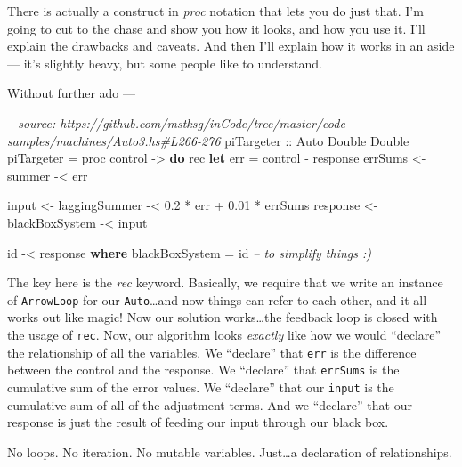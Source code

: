 \documentclass[]{article}
\newenvironment{Shaded}{}{}
\newcommand{\KeywordTok}[1]{\textcolor[rgb]{0.00,0.44,0.13}{\textbf{{#1}}}}
\newcommand{\DataTypeTok}[1]{\textcolor[rgb]{0.56,0.13,0.00}{{#1}}}
\newcommand{\FloatTok}[1]{\textcolor[rgb]{0.25,0.63,0.44}{{#1}}}
\newcommand{\CommentTok}[1]{\textcolor[rgb]{0.38,0.63,0.69}{\textit{{#1}}}}
\newcommand{\OtherTok}[1]{\textcolor[rgb]{0.00,0.44,0.13}{{#1}}}
\newcommand{\FunctionTok}[1]{\textcolor[rgb]{0.02,0.16,0.49}{{#1}}}
\newcommand{\NormalTok}[1]{{#1}}
\begin{document}
There is actually a construct in \emph{proc} notation that lets you do
just that. I'm going to cut to the chase and show you how it looks, and
how you use it. I'll explain the drawbacks and caveats. And then I'll
explain how it works in an aside --- it's slightly heavy, but some
people like to understand.

Without further ado ---

\begin{Shaded}
\begin{Highlighting}[]
\CommentTok{-- source: https://github.com/mstksg/inCode/tree/master/code-samples/machines/Auto3.hs#L266-276}
\OtherTok{piTargeter ::} \DataTypeTok{Auto} \DataTypeTok{Double} \DataTypeTok{Double}
\NormalTok{piTargeter }\FunctionTok{=} \NormalTok{proc control }\OtherTok{->} \KeywordTok{do}
    \NormalTok{rec }\KeywordTok{let} \NormalTok{err }\FunctionTok{=} \NormalTok{control }\FunctionTok{-} \NormalTok{response}
        \NormalTok{errSums  }\OtherTok{<-} \NormalTok{summer         }\FunctionTok{-<} \NormalTok{err}

        \NormalTok{input    }\OtherTok{<-} \NormalTok{laggingSummer  }\FunctionTok{-<} \FloatTok{0.2} \FunctionTok{*} \NormalTok{err }\FunctionTok{+} \FloatTok{0.01} \FunctionTok{*} \NormalTok{errSums}
        \NormalTok{response }\OtherTok{<-} \NormalTok{blackBoxSystem }\FunctionTok{-<} \NormalTok{input}

    \NormalTok{id }\FunctionTok{-<} \NormalTok{response}
  \KeywordTok{where}
    \NormalTok{blackBoxSystem }\FunctionTok{=} \NormalTok{id     }\CommentTok{-- to simplify things :)}
\end{Highlighting}
\end{Shaded}

The key here is the \emph{rec} keyword. Basically, we require that we
write an instance of \texttt{ArrowLoop} for our \texttt{Auto}\ldots{}and
now things can refer to each other, and it all works out like magic! Now
our solution works\ldots{}the feedback loop is closed with the usage of
\texttt{rec}. Now, our algorithm looks \emph{exactly} like how we would
``declare'' the relationship of all the variables. We ``declare'' that
\texttt{err} is the difference between the control and the response. We
``declare'' that \texttt{errSums} is the cumulative sum of the error
values. We ``declare'' that our \texttt{input} is the cumulative sum of
all of the adjustment terms. And we ``declare'' that our response is
just the result of feeding our input through our black box.

No loops. No iteration. No mutable variables. Just\ldots{}a declaration
of relationships.
\end{document}
